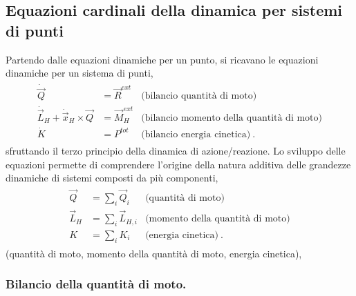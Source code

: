 \documentclass[letterpaper,10pt,italian]{jupyterBook}
\begin{document}
\subsection{Equazioni cardinali della dinamica per sistemi di punti}
\label{\detokenize{ch/mechanics/dynamics-notes:equazioni-cardinali-della-dinamica-per-sistemi-di-punti}}\label{\detokenize{ch/mechanics/dynamics-notes:physics-hs-mechanics-dynamics-eom-points}}
\sphinxAtStartPar
Partendo dalle equazioni dinamiche per un punto, si ricavano le equazioni dinamiche per un sistema di punti,
\begin{equation*}
\begin{split}\begin{aligned}
 \dot{\vec{Q}} & = \vec{R}^{ext} & \text{(bilancio quantità di moto)} \\
 \dot{\vec{L}}_H + \dot{\vec{x}}_H \times \vec{Q} & = \vec{M}_H^{ext} & \text{(bilancio momento della quantità di moto)} \\
 \dot{K} & = P^{tot} & \text{(bilancio energia cinetica)} \ .
\end{aligned}\end{split}
\end{equation*}
\sphinxAtStartPar
sfruttando il terzo principio della dinamica di azione/reazione. Lo sviluppo delle equazioni permette di comprendere l’origine della natura additiva delle grandezze dinamiche di sistemi composti da più componenti,
\begin{equation*}
\begin{split}\begin{aligned}
\vec{Q}     & = \sum_i \vec{Q}_i     & \text{(quantità di moto)}\\
\vec{L}_{H} & = \sum_i \vec{L}_{H,i} & \text{(momento della quantità di moto)}\\
 K          & = \sum_i K_i           & \text{(energia cinetica)} \ .
\end{aligned}\end{split}
\end{equation*}
\sphinxAtStartPar
(quantità di moto, momento della quantità di moto, energia cinetica),
\subsubsection*{Bilancio della quantità di moto.}
\end{document}
